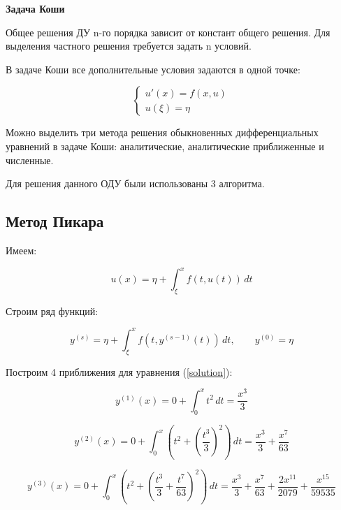 \textbf{Задача Коши}

Общее решения ДУ n-го порядка зависит от констант общего решения. Для выделения частного решения требуется задать n условий.

В задаче Коши все дополнительные условия задаются в одной точке:

\begin{equation}
{\begin{cases}
	u'(x) = f(x,u) \\
	u(\xi) = \eta
	\end{cases}}
\label{eq:ref1}
\end{equation}


Можно выделить три метода решения обыкновенных дифференциальных уравнений в задаче Коши: аналитические, аналитические приближенные и численные.


Для решения данного ОДУ были использованы 3 алгоритма.

\subsection{Метод Пикара}

Имеем:

\begin{equation}
    \label{solution}
    u(x) = \eta +  \int_{\xi}^{x} f(t,u(t)) \,dt
\end{equation}

Строим ряд функций:

\begin{equation}
    \label{sol}
    y^{(s)} = \eta +  \int_{\xi}^{x} f(t,y^{(s-1)}(t)) \,dt, \quad \quad
    y^{(0)} = \eta
\end{equation}

Построим 4 приближения для уравнения (\ref{solution}):

\begin{equation}
    \label{f1}
    y^{(1)}(x) = 0 + \int_{0}^{x} t^2 \,dt = \frac{x^3}{3}
\end{equation}

\begin{equation}
    \label{f2}
    y^{(2)}(x) = 0 + \int_{0}^{x} (t^2 + \left(\frac{t^3}{3}\right)^2) \,dt = \frac{x^3}{3} + \frac{x^7}{63}
\end{equation}

\begin{equation}
    \label{f3}
    y^{(3)}(x) = 0 + \int_{0}^{x} (t^2 + \left(\frac{t^3}{3} + \frac{t^7}{63}\right)^2) \,dt = \frac{x^3}{3} + \frac{x^7}{63} + \frac{2x^{11}}{2079} + \frac{x^{15}}{59535}
\end{equation}


